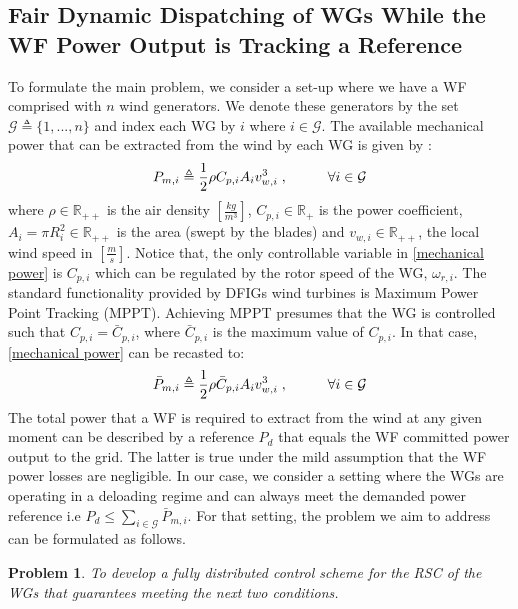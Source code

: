 \documentclass[letterpaper, 10 pt, conference]{ieeeconf}
\newtheorem{problem}{\textnormal{\textbf{Problem}}}
\begin{document}
\subsection{Fair Dynamic Dispatching of WGs  While the WF Power Output is Tracking a Reference}
To formulate the main problem, we consider a set-up where we have a WF comprised with $n$ wind generators. We denote these generators by the set $\mathcal{G}\triangleq\{1,...,n\}$ and index each WG by $i$ where $i\in\mathcal{G}$. The available mechanical power that can be extracted from the wind by each WG is given by \cite{Pai}:
\begin{equation}
P_{m,i}\triangleq\frac{1}{2}\rho C_{p,i} A_{i} v_{w,i}^3\;, \hspace{10mm} \forall i\in\mathcal{G}
\label{mechanical power}
\end{equation}
where $\rho\in\mathbb{R}_{++}$ is the air density $[\frac{kg}{m^3}]$, $C_{p,i}\in\mathbb{R}_{+}$ is the power coefficient,  $A_i=\pi R_i^2\in\mathbb{R}_{++}$ is the area (swept by the blades) and $v_{w,i}\in\mathbb{R}_{++}$, the local wind speed in $[\frac{m}{s}]$. Notice that, the only controllable variable in \eqref{mechanical power} is $C_{p,i}$  which can be regulated by the rotor speed of the WG,  $\omega_{r,i}$. The standard functionality provided by DFIGs wind turbines is Maximum Power Point Tracking (MPPT). Achieving MPPT presumes that the WG is controlled such that  $C_{p,i}=\bar{C}_{p,i}$, where $\bar{C}_{p,i}$ is the maximum value of $C_{p,i}$. In that case, \eqref{mechanical power} can be recasted to:
\begin{equation}
\bar{P}_{m,i}\triangleq\frac{1}{2}\rho \bar{C}_{p,i} A_{i} v_{w,i}^3\;, \hspace{10mm} \forall i\in\mathcal{G}
\label{mechanical power max}
\end{equation}
The total power that a WF is required to extract from the wind at any given moment can be described by a reference $P_d$ that equals the WF committed power output to the grid. The latter is true under the mild assumption that the WF power losses are negligible. In our case, we consider a setting where the  WGs are operating in a deloading regime and can always meet the demanded power reference i.e $P_d\leq \sum_{i\in\mathcal{G}} \bar{P}_{m,i}$. For that setting, the problem we aim to address can be formulated as follows.
\begin{problem}
To develop a fully distributed control scheme for the RSC of the WGs that guarantees meeting the next two conditions.
\label{Problem1}
\end{problem}
\end{document}
